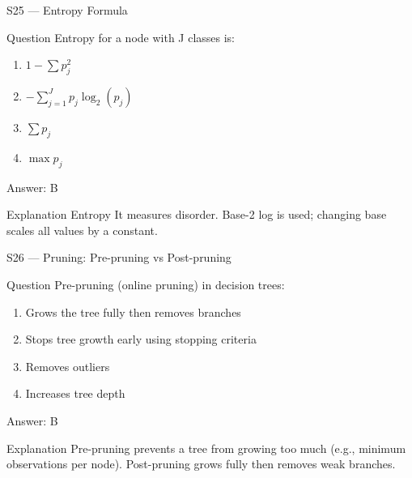 \documentclass[aspectratio=169,8pt]{beamer}
\begin{document}
	\begin{frame}{S25 --- Entropy Formula}
		\begin{block}{Question}
			Entropy for a node with J classes is:
			\begin{enumerate}
				\item $1 - \sum p_j^2$
				\item $-\sum_{j=1}^{J} p_j \log_2(p_j)$
				\item $\sum p_j$
				\item $\max p_j$
			\end{enumerate}
		\end{block}
		\begin{exampleblock}{Answer: B}\end{exampleblock}
		\begin{block}{Explanation}
			Entropy   It measures disorder. Base-2 log is used; changing base scales all values by a constant.
		\end{block}
	\end{frame}
	
	\begin{frame}{S26 --- Pruning: Pre-pruning vs Post-pruning}
		\begin{block}{Question}
			Pre-pruning (online pruning) in decision trees:
			\begin{enumerate}
				\item Grows the tree fully then removes branches
				\item Stops tree growth early using stopping criteria
				\item Removes outliers
				\item Increases tree depth
			\end{enumerate}
		\end{block}
		\begin{exampleblock}{Answer: B}\end{exampleblock}
		\begin{block}{Explanation}
			Pre-pruning prevents a tree from growing too much (e.g., minimum observations per node). Post-pruning grows fully then removes weak branches.
		\end{block}
	\end{frame}
	
\end{document}
